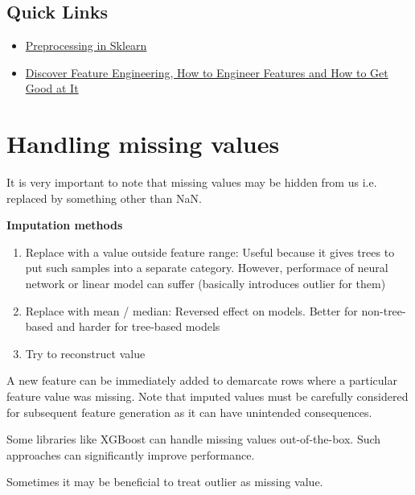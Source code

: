 \documentclass[a4paper]{article}
\begin{document}
\subsection{Quick Links}
\begin{itemize}
\item \href{http://scikit-learn.org/stable/modules/preprocessing.html}{Preprocessing in Sklearn}
\item \href{https://machinelearningmastery.com/discover-feature-engineering-how-to-engineer-features-and-how-to-get-good-at-it/}{Discover Feature Engineering, How to Engineer Features and How to Get Good at It}
\end{itemize}

\section{Handling missing values}
It is very important to note that missing values may be hidden from us i.e. replaced by something other than NaN.

\textbf{Imputation methods}
\begin{enumerate}
\item Replace with a value outside feature range: Useful because it gives trees to put such samples into a separate category. However, performace of neural network or linear model can suffer (basically introduces outlier for them)
\item Replace with mean / median: Reversed effect on models. Better for non-tree-based and harder for tree-based models
\item Try to reconstruct value
\end{enumerate}

A new feature can be immediately added to demarcate rows where a particular feature value was missing. Note that imputed values must be carefully considered for subsequent feature generation as it can have unintended consequences.

Some libraries like XGBoost can handle missing values out-of-the-box. Such approaches can significantly improve performance. 

Sometimes it may be beneficial to treat outlier as missing value.
\end{document}
